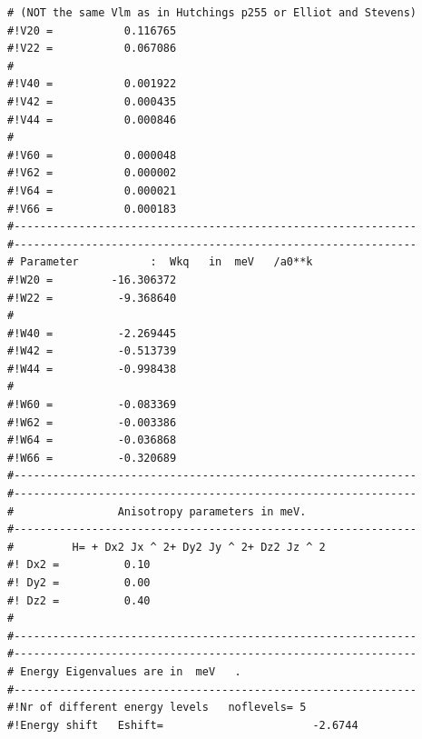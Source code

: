 \begin{enumerate}
{\begin{verbatim}
# (NOT the same Vlm as in Hutchings p255 or Elliot and Stevens)
#!V20 =           0.116765                                     
#!V22 =           0.067086                                     
#                                                              
#!V40 =           0.001922                                     
#!V42 =           0.000435                                     
#!V44 =           0.000846                                     
#                                                              
#!V60 =           0.000048                                     
#!V62 =           0.000002                                     
#!V64 =           0.000021                                     
#!V66 =           0.000183                                     
#-------------------------------------------------------------- 
#-------------------------------------------------------------- 
# Parameter           :  Wkq   in  meV   /a0**k                  
#!W20 =         -16.306372                                     
#!W22 =          -9.368640                                     
#                                                              
#!W40 =          -2.269445                                     
#!W42 =          -0.513739                                     
#!W44 =          -0.998438                                     
#                                                              
#!W60 =          -0.083369                                     
#!W62 =          -0.003386                                     
#!W64 =          -0.036868                                     
#!W66 =          -0.320689                                     
#-------------------------------------------------------------- 
#-------------------------------------------------------------- 
#                Anisotropy parameters in meV.                  
#-------------------------------------------------------------- 
#         H= + Dx2 Jx ^ 2+ Dy2 Jy ^ 2+ Dz2 Jz ^ 2               
#! Dx2 =          0.10                                     
#! Dy2 =          0.00                                     
#! Dz2 =          0.40                                     
#                                                              
#-------------------------------------------------------------- 
#-------------------------------------------------------------- 
# Energy Eigenvalues are in  meV   .          	            
#--------------------------------------------------------------
#!Nr of different energy levels   noflevels= 5                 
#!Energy shift   Eshift=                       -2.6744 

\end{verbatim}}
\end{enumerate}

